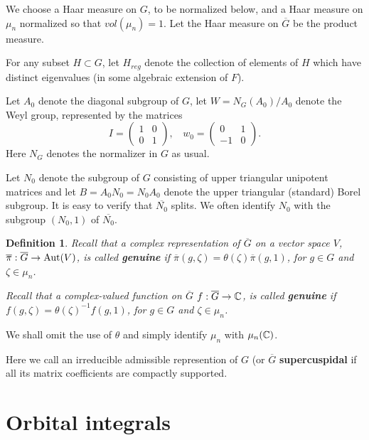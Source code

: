 \documentclass[twocolumn,10pt]{article}
\newtheorem{definition}[theorem]{Definition}
\begin{document}
We choose a Haar measure on $G$, to be normalized
below, and a Haar measure on $\mu_n$ normalized so that 
$vol(\mu_n)=1$. Let the Haar measure on $\overline{G}$ be
the product measure.

For any subset $H\subset G$, let $H_{reg}$
denote the collection of elements of
$H$ which have distinct eigenvalues (in
some algebraic extension of $F$).

Let $A_0$ denote the diagonal subgroup of
$G$, let $W=N_G(A_0)/A_0$ denote the Weyl
group, represented by the matrices
\[
I=
\left(
\begin{array}{cc}
1 & 0 \\
0 & 1
\end{array}
\right),\ \ \ \ 
w_0=
\left(
\begin{array}{cc}
0 & 1 \\
-1 & 0
\end{array}
\right).
\]
Here $N_G$ denotes the normalizer in $G$ as usual.

Let $N_0$ denote the subgroup of 
$G$ consisting of upper triangular unipotent matrices 
and let $B=A_0N_0=N_0 A_0$ denote the upper
triangular (standard) Borel subgroup.
It is easy to verify that $\overline{N_0}$ splits.
We often identify $N_0$ with the
subgroup $(N_0,1)$ of $\overline{N_0}$.

\begin{definition}
Recall that a complex representation of $\overline{G}$
on a vector space $V$,
$\overline{\pi}:\overline{G}\rightarrow {\rm Aut}(V)$,
is called {\bf genuine} if $\overline{\pi}(g,\zeta)
=\theta(\zeta)\overline{\pi}(g,1)$, for
$g\in G$ and $\zeta\in \mu_n$.

Recall that a complex-valued function on $\overline{G}$
$f:\overline{G}\rightarrow {\Bbb{C}}$,
is called {\bf genuine} if $f(g,\zeta)
=\theta(\zeta)^{-1}f(g,1)$, for
$g\in G$ and $\zeta\in \mu_n$.
\end{definition}

We shall omit the use of $\theta$ and simply
identify $\mu_n$ with $\mu_n({\Bbb{C}})$.

Here we call an irreducible 
admissible represention of $G$ (or $\overline{G}$ 
{\bf supercuspidal}
if all its matrix coefficients are compactly supported.

\section{Orbital integrals}
\end{document}
